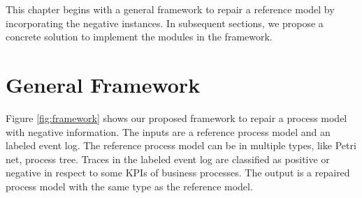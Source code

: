 

This chapter begins with a general framework to repair a reference model by incorporating the negative instances. In subsequent sections, we propose a concrete solution to implement the modules in the framework. 
\section{General Framework}
Figure \ref{fig:framework} shows our proposed framework to repair a process model with negative information. The inputs are a reference process model and an labeled event log. The reference process model can be in multiple types, like Petri net, process tree. Traces in the labeled event log are classified as positive or negative in respect to some KPIs of business processes. The output is a repaired process model with the same type as the reference model.

